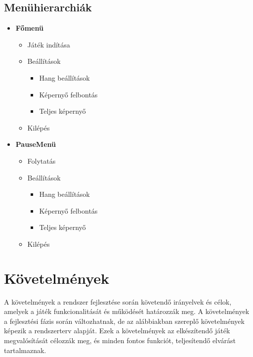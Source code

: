 \documentclass[
]{thesis-ekf}
\theoremstyle{definition}
\theoremstyle{remark}
\begin{document}
\subsection{Menühierarchiák}
\begin{itemize}
	\item \textbf{Főmenü}
	\begin{itemize}
		\item Játék indítása
		\item Beállítások
		\begin{itemize}
			\item Hang beállítások
			\item Képernyő felbontás
			\item Teljes képernyő
		\end{itemize}
		\item Kilépés
	\end{itemize}
	\item \textbf{PauseMenü}
	\begin{itemize}
		\item Folytatás
		\item Beállítások
		\begin{itemize}
			\item Hang beállítások
			\item Képernyő felbontás
			\item Teljes képernyő
		\end{itemize}
		\item Kilépés
	\end{itemize}
\end{itemize}
\section{Követelmények}
A követelmények a rendszer fejlesztése során követendő irányelvek és célok, amelyek a játék funkcionalitását és működését határozzák meg. A követelmények a fejlesztési fázis során változhatnak, de az alábbiakban szereplő követelmények képezik a rendszerterv alapját. Ezek a követelmények az elkészítendő játék megvalósítását célozzák meg, és minden fontos funkciót, teljesítendő elvárást tartalmaznak.
\end{document}

